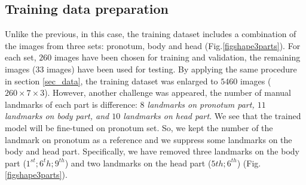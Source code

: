 \documentclass[10pt]{article}
\begin{document}


\subsection{Training data preparation}
Unlike the previous, in this case, the training dataset includes a combination of the images from three sets: pronotum, body and head (Fig.\ref{figshape3parts}). For each set, $260$ images have been chosen for training and validation, the remaining images ($33$ images) have been used for testing. By applying the same procedure in section \ref{sec_data}, the training dataset was enlarged to $5460$ images ($260 \times 7 \times 3$). However, another challenge was appeared, the number of manual landmarks of each part is difference: \textit{$8$ landmarks on pronotum part, $11$ landmarks on body part, and $10$ landmarks on head part}. We see that the trained model will be fine-tuned on pronotum set. So, we kept the number of the landmark on pronotum as a reference and we suppress some landmarks on the body and head part. Specifically, we have removed three landmarks on the body part ($1^{st}; 6^{t}h; 9^{th}$) and two landmarks on the head part ($5{th}; 6^{th}$) (Fig.\ref{figshape3parts}).
\end{document}
